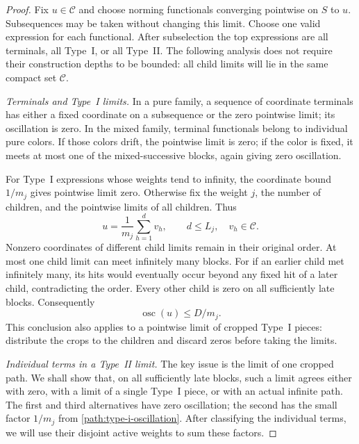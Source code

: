 \begin{proof}
Fix $u\in\mathcal C$ and choose norming functionals converging
pointwise on $S$ to $u$.  Subsequences may be taken without changing
this limit.  Choose one valid expression for each functional.  After
subselection the top expressions are all terminals, all Type~I, or
all Type~II.  The following analysis does not require their
construction depths to be bounded: all child limits will lie in the
same compact set $\mathcal C$.

\smallskip\noindent
\emph{Terminals and Type~I limits.}
In a pure family, a sequence of coordinate terminals has either a
fixed coordinate on a subsequence or the zero pointwise limit; its
oscillation is zero.  In the mixed family, terminal functionals belong
to individual pure colors.  If those colors drift, the pointwise
limit is zero; if the color is fixed, it meets at most one of the
mixed-successive blocks, again giving zero oscillation.

For Type~I expressions whose weights tend to infinity, the coordinate
bound $1/m_j$ gives pointwise limit zero.  Otherwise fix the weight
$j$, the number of children, and the pointwise limits of all children.
Thus
\[
 u=\frac1{m_j}\sum_{h=1}^{d}v_h,
 \qquad d\le L_j,\quad v_h\in\mathcal C.
\]
Nonzero coordinates of different child limits remain in their
original order.  At most one child limit can meet infinitely many
blocks.  For if an earlier child met infinitely many, its hits would
eventually occur beyond any fixed hit of a later child, contradicting
the order.  Every other child is zero on all sufficiently late
blocks.  Consequently
\begin{equation}
 \operatorname{osc}(u)\le D/m_j.
 \label{path:type-i-oscillation}
\end{equation}
This conclusion also applies to a pointwise limit of cropped
Type~I pieces: distribute the crops to the children and discard zeros
before taking the limits.

\smallskip\noindent
\emph{Individual terms in a Type~II limit.}
The key issue is the limit of one cropped path. We shall show that, on
all sufficiently late blocks, such a limit agrees either with zero,
with a limit of a single Type~I piece, or with an actual infinite path.
The first and third alternatives have zero oscillation; the second has
the small factor $1/m_j$ from \eqref{path:type-i-oscillation}. After
classifying the individual terms, we will use their disjoint active
weights to sum these factors.


\end{proof}
